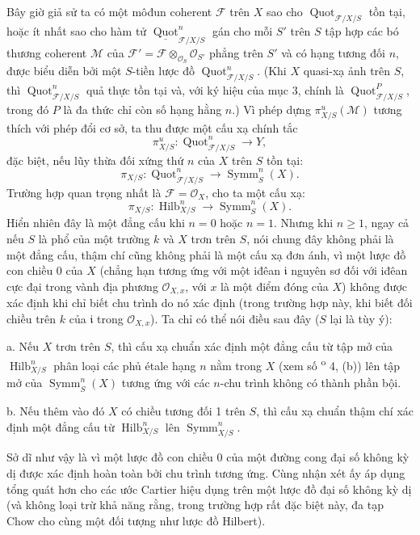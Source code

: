 \documentclass[11pt,twoside,openany]{book}
\numberwithin{equation}{section}
\newcommand{\src}[1]{%
  \phantomsection\hypertarget{src:\fgasourceid:#1}{}%
  \marginpar{\raggedleft\footnotesize\sffamily #1}%
}
\newcommand{\fgasourceid}{unset}
\begin{document}
Bây giờ giả sử ta có một môđun coherent $\mathcal F$ trên $X$ sao cho
$\operatorname{Quot}_{\mathcal F/X/S}$ tồn tại, hoặc ít nhất sao cho hàm tử
$\underline{\operatorname{Quot}}^n_{\mathcal F/X/S}$ gán cho mỗi $S'$ trên
$S$ tập hợp các bó thương coherent $\mathcal M$ của
$\mathcal F'=\mathcal F\otimes_{\mathcal O_S}\mathcal O_{S'}$ phẳng trên
$S'$ và có hạng tương đối $n$, được biểu diễn bởi một $S$-tiền lược đồ
$\operatorname{Quot}^n_{\mathcal F/X/S}$. (Khi $X$ quasi-xạ ảnh trên $S$,
thì $\operatorname{Quot}^n_{\mathcal F/X/S}$ quả thực tồn tại và, với ký hiệu
của mục 3, chính là $\operatorname{Quot}^P_{\mathcal F/X/S}$, trong đó $P$ là
đa thức chỉ còn số hạng hằng $n$.) Vì phép dựng
$\pi^u_{X/S}(\mathcal M)$ tương thích với phép đổi cơ sở, ta thu được một cấu
xạ chính tắc
\[
\pi^u_{X/S}:\operatorname{Quot}^n_{\mathcal F/X/S}\longrightarrow Y,
\]
đặc biệt, nếu lũy thừa đối xứng thứ $n$ của $X$ trên $S$ tồn tại:
\[
\pi_{X/S}:\operatorname{Quot}^n_{\mathcal F/X/S}
\longrightarrow\operatorname{Symm}^n_S(X).
\]
Trường hợp quan trọng nhất là $\mathcal F=\mathcal O_X$, cho ta một cấu xạ:
\[
\pi_{X/S}:\operatorname{Hilb}^n_{X/S}
\longrightarrow\operatorname{Symm}^n_S(X).
\]
Hiển nhiên đây là một đẳng cấu khi $n=0$ hoặc $n=1$. Nhưng khi
$n\geq1$, ngay cả nếu $S$ là phổ của một trường $k$ và $X$ trơn trên
$S$, nói chung đây không phải là một đẳng cấu, thậm chí cũng không phải là một
cấu xạ đơn ánh, vì một lược đồ con chiều 0 của $X$ (chẳng hạn tương ứng với
một iđêan $\mathfrak i$ nguyên sơ đối với iđêan cực đại trong vành địa phương
$\mathcal O_{X,x}$, với $x$ là một điểm đóng của $X$) không được xác định khi
chỉ biết chu trình do nó xác định (trong trường hợp này, khi biết đối chiều
trên $k$ của $\mathfrak i$ trong $\mathcal O_{X,x}$). Ta chỉ có thể nói điều
sau đây ($S$ lại là tùy ý):

\medskip
\noindent a. Nếu $X$ trơn trên $S$, thì cấu xạ chuẩn xác định một đẳng cấu từ
tập mở của $\operatorname{Hilb}^n_{X/S}$ phân loại các phủ étale hạng $n$ nằm
trong $X$ (xem số \textsuperscript{o} 4, (b)) lên tập mở của
$\operatorname{Symm}^n_S(X)$ tương ứng với các $n$-chu trình không có thành
phần bội.
\src{275}

\medskip
\noindent b. Nếu thêm vào đó $X$ có chiều tương đối 1 trên $S$, thì cấu xạ
chuẩn thậm chí xác định một đẳng cấu từ $\operatorname{Hilb}^n_{X/S}$ lên
$\operatorname{Symm}^n_{X/S}$.

Sở dĩ như vậy là vì một lược đồ con chiều 0 của một đường cong đại số không
kỳ dị được xác định hoàn toàn bởi chu trình tương ứng. Cùng nhận xét ấy áp
dụng tổng quát hơn cho các ước Cartier hiệu dụng trên một lược đồ đại số không
kỳ dị (và không loại trừ khả năng rằng, trong trường hợp rất đặc biệt này, đa
tạp Chow cho cùng một đối tượng như lược đồ Hilbert).
\end{document}

